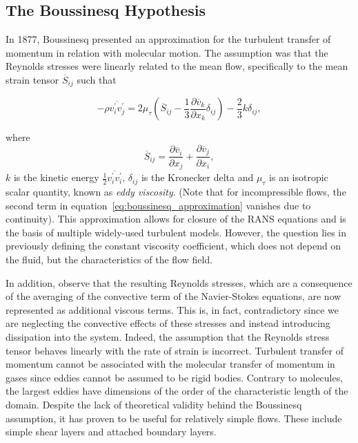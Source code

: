 \subsection{The Boussinesq Hypothesis}
In 1877, Boussinesq presented an approximation for the turbulent transfer of momentum in relation with molecular motion. The assumption was that the Reynolds stresses were linearly related to the mean flow, specifically to the mean strain tensor $\overline S_{ij}$ such that
\begin{eqBox}
\begin{equation}
	-\rho \overline{v_i^\prime v_j^\prime} = 
		2 \mu_\tau \left(\overline S_{ij} - \frac{1}{3} \frac{\partial \overline v_k}{\partial x_k}\delta_{ij}
		\right) - \frac{2}{3} k \delta_{ij},
	\label{eq:boussinesq_approximation}
\end{equation}
\end{eqBox}
where
\begin{equation}
	\overline S_{ij} = 
	\frac{\partial \overline v_i}{\partial x_j} 
		+ \frac{\partial \overline v_j}{\partial x_i},
\end{equation}
$k$ is the kinetic energy $\frac{1}{2}\overline{v_i^\prime v_i^\prime}$, $\delta_{ij}$ is the Kronecker delta and $\mu_\tau$ is an isotropic scalar quantity, known as \textit{eddy viscosity}. (Note that for incompressible flows, the second term in equation~\ref{eq:boussinesq_approximation} vanishes due to continuity). This approximation allows for closure of the RANS equations and is the basis of multiple widely-used turbulent models. However, the question lies in previously defining the constant viscosity coefficient, which does not depend on the fluid, but the characteristics of the flow field. 

In addition, observe that the resulting Reynolds stresses, which are a consequence of the averaging of the convective term of the Navier-Stokes equations, are now represented as additional viscous terms. This is, in fact, contradictory since we are neglecting the convective effects of these stresses and instead introducing dissipation into the system. Indeed, the assumption that the Reynolds stress tensor behaves linearly with the rate of strain is incorrect. Turbulent transfer of momentum cannot be associated with the molecular transfer of momentum in gases since eddies cannot be assumed to be rigid bodies.  Contrary to molecules, the largest eddies have dimensions of the order of the characteristic length of the domain. Despite the lack of theoretical validity behind the Boussinesq assumption, it has proven to be useful for relatively simple flows. These include simple shear layers and attached boundary layers. 

